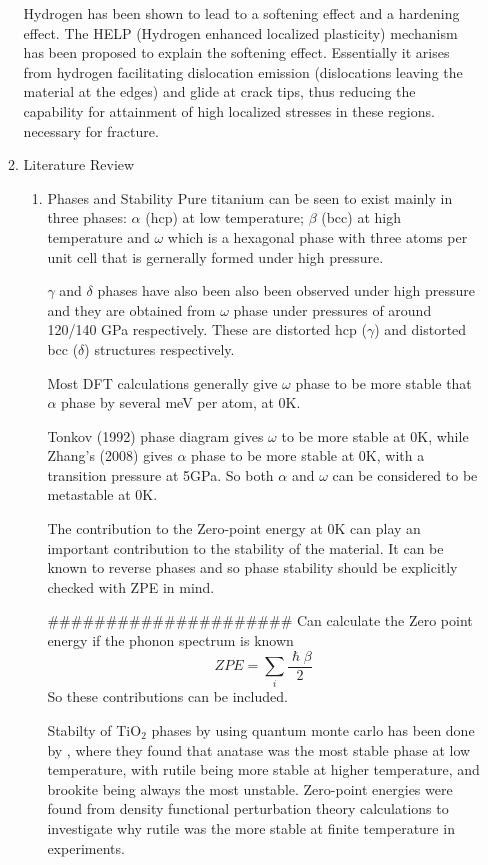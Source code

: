 \documentclass[11pt]{article}
\begin{document}
\begin{enumerate}
\begin{enumerate}
Hydrogen has been shown to lead to a softening effect and a hardening effect. The HELP 
(Hydrogen enhanced localized plasticity) mechanism has been proposed to explain the softening effect. 
Essentially it arises from hydrogen facilitating dislocation emission (dislocations leaving the material
at the edges) and glide at crack tips, thus reducing the capability for attainment of high localized
stresses in these regions. necessary for fracture. 






\item Literature Review
\label{sec:org6a29cb9}

\begin{enumerate}
\item Phases and Stability
\label{sec:orgcd4da69}
Pure titanium can be seen to exist mainly in three phases: \(\alpha\) (hcp) at low temperature; 
\(\beta\) (bcc) at high temperature and \(\omega\) which is a hexagonal phase with three atoms per 
unit cell that is gernerally formed under high pressure.

\(\gamma\) and \(\delta\) phases have also been also been observed under high pressure and they are
obtained from \(\omega\) phase under pressures of around 120/140 GPa respectively. These are distorted 
hcp (\(\gamma\)) and distorted bcc (\(\delta\)) structures respectively. 

Most DFT calculations generally give \(\omega\) phase to be more stable that \(\alpha\) phase by several 
meV per atom, at 0K.

Tonkov (1992) phase diagram gives \(\omega\) to be more stable at 0K, while Zhang's (2008) gives \(\alpha\) phase
to be more stable at 0K, with a transition pressure at 5GPa. So both \(\alpha\) and \(\omega\) can be considered 
to be metastable at 0K. 

The contribution to the Zero-point energy at 0K can play an important contribution to the stability of 
the material. It can be known to reverse phases and so phase stability should be explicitly checked
with ZPE in mind. 

\#\#\#\#\#\#\#\#\#\#\#\#\#\#\#\#\#\#\#\#\#
Can calculate the Zero point energy if the phonon spectrum is known 
\[
ZPE = \sum_i \frac{\hslash\beta}{2}
\]
So these contributions can be included. 

Stabilty of TiO\(_2\) phases by using quantum monte carlo has been done by \cite{Luo2016}, 
where they found that anatase was the most stable phase at low temperature, with rutile being more stable 
at higher temperature, and brookite being always the most unstable. Zero-point energies were found from 
density functional perturbation theory calculations to investigate why rutile was the more stable at finite temperature
in experiments. 


\end{enumerate}
\end{enumerate}
\end{enumerate}
\end{document}
